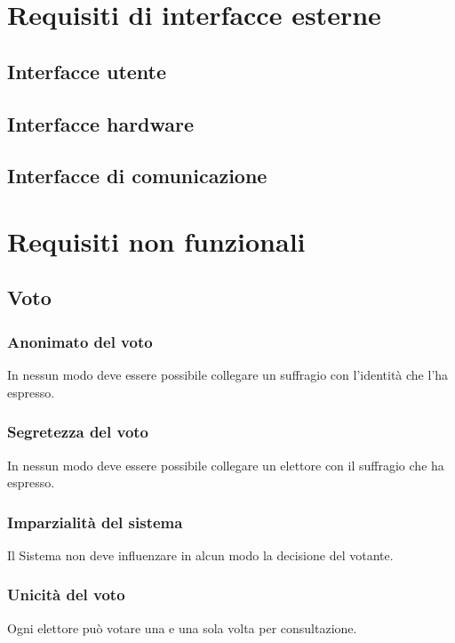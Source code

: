 \documentclass{report}
\begin{document}
\section{Requisiti di interfacce esterne}


\subsection{Interfacce utente}


\subsection{Interfacce hardware}


\subsection{Interfacce di comunicazione}




\section{Requisiti non funzionali}


\subsection{Voto}

\subsubsection{Anonimato del voto}
In nessun modo deve essere possibile collegare un suffragio con l'identità che l'ha espresso.

\subsubsection{Segretezza del voto}
In nessun modo deve essere possibile collegare un elettore con il suffragio che ha espresso.

\subsubsection{Imparzialità del sistema}
Il Sistema non deve influenzare in alcun modo la decisione del votante.

\subsubsection{Unicità del voto}
Ogni elettore può votare una e una sola volta per consultazione.
\end{document}
